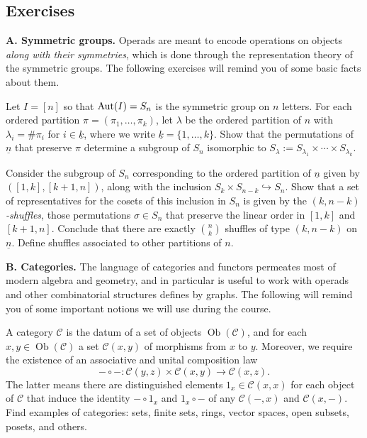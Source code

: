 \newpage

\subsection{Exercises}
 
\textbf{A. Symmetric groups.} Operads are meant to encode
operations on objects \emph{along with their symmetries},
which is done through the representation theory of the
symmetric groups. The following exercises will remind
you of some basic facts about them.


\begin{question} Let $I = [n]$ so that $\operatorname{Aut}(I) = S_n$ is 
the symmetric group on $n$ letters. For each ordered 
partition $\pi = (\pi_1,\ldots,\pi_k)$, let $\lambda$
be the ordered partition of $n$ with $\lambda_i = \# \pi_i$
for $i\in \underline{k}$, where
we write $\underline{k} = \{1,\ldots,k\}$. Show that the permutations of
$\underline{n}$ that preserve $\pi$ determine a subgroup of $S_n$
isomorphic to $S_\lambda := S_{\lambda_1}\times
\cdots \times S_{\lambda_k}$. 
\end{question}


\begin{question} Consider the subgroup of $S_n$ corresponding
to the ordered partition of $\underline{n}$ given by $([1,k],[k+1,n])$, along with the 
inclusion $S_k\times S_{n-k} \hookrightarrow S_n$. Show that
a set of representatives for the cosets of this inclusion
in $S_n$ is given by the \emph{$(k,n-k)$-shuffles}, those
permutations $\sigma\in S_n$ that preserve the linear order in
$[1,k]$ and $[k+1,n]$. Conclude that there are exactly
$\binom nk$ shuffles of type $(k,n-k)$ on $\underline{n}$. Define
shuffles associated to other partitions of $n$.
\end{question}

\medskip
\textbf{B. Categories.} The language of categories and
functors permeates most of modern algebra and geometry,
and in particular is useful to work with operads and
other combinatorial structures defines by graphs. The
following will remind you of some important notions
we will use during the course.

\begin{question} A category $\mathcal C$ is the datum of
a set of objects $\operatorname{Ob}(\mathcal{C})$, and
for each $x,y\in \operatorname{Ob}(\mathcal{C})$ a
set $\mathcal C(x,y)$ of morphisms from $x$ to $y$.
Moreover, we require the existence of an associative
and unital composition law
\[-\circ -: \mathcal C(y,z) \times  \mathcal C(x,y) 
	\longrightarrow \mathcal C(x,z). \] 
	The latter means there are distinguished elements
	$1_x\in \mathcal{C}(x,x)$ for each object of $\mathcal{C}$
	that induce the identity $-\circ 1_x$ and $1_x\circ -$
	of any $\mathcal{C}(-,x)$ and $\mathcal{C}(x,-)$.
	Find examples of categories: sets, finite sets,
	rings, vector spaces, open subsets, posets, and 
	others.
\end{question}

